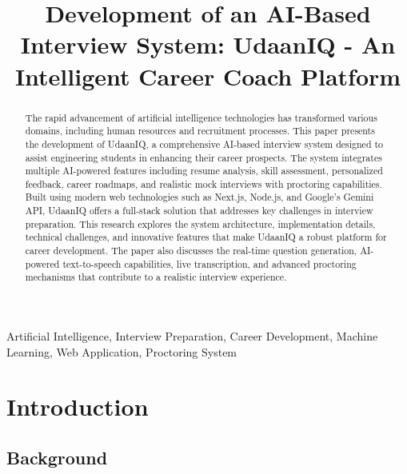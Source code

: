 \documentclass[12pt, conference]{IEEEtran}
\begin{document}
\title{Development of an AI-Based Interview System: UdaanIQ - An Intelligent Career Coach Platform}

\author{
}

\maketitle

\begin{abstract}
The rapid advancement of artificial intelligence technologies has transformed various domains, including human resources and recruitment processes. This paper presents the development of UdaanIQ, a comprehensive AI-based interview system designed to assist engineering students in enhancing their career prospects. The system integrates multiple AI-powered features including resume analysis, skill assessment, personalized feedback, career roadmaps, and realistic mock interviews with proctoring capabilities. Built using modern web technologies such as Next.js, Node.js, and Google's Gemini API, UdaanIQ offers a full-stack solution that addresses key challenges in interview preparation. This research explores the system architecture, implementation details, technical challenges, and innovative features that make UdaanIQ a robust platform for career development. The paper also discusses the real-time question generation, AI-powered text-to-speech capabilities, live transcription, and advanced proctoring mechanisms that contribute to a realistic interview experience.
\end{abstract}

\begin{IEEEkeywords}
Artificial Intelligence, Interview Preparation, Career Development, Machine Learning, Web Application, Proctoring System
\end{IEEEkeywords}

\section{Introduction}

\subsection{Background}
\end{document}
